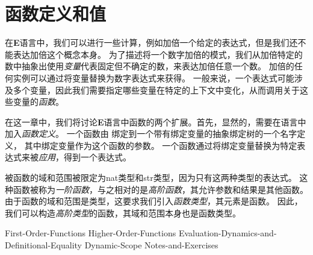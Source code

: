 \chapter{函数定义和值}

在\textbf{E}语言中，我们可以进行一些计算，例如加倍一个给定的表达式，但是我们还不能表达加倍这个概念本身。
为了描述将一个数字加倍的模式，我们从加倍特定的数中抽象出使用\textit{变量}代表固定但不确定的数，来表达加倍任意一个数。
加倍的任何实例可以通过将变量替换为数字表达式来获得。
一般来说，一个表达式可能涉及多个变量，因此我们需要指定哪些变量在特定的上下文中变化，从而调用关于这些变量的\textit{函数}。

在这一章中，我们将讨论\textbf{E}语言中函数的两个扩展。首先，显然的，需要在语言中加入\textit{函数定义}。
一个函数由 绑定到一个带有绑定变量的抽象绑定树的一个名字定义， 其中绑定变量作为这个函数的参数。
一个函数通过将绑定变量替换为特定表达式来被\textit{应用}，得到一个表达式。

被函数的域和范围被限定为nat类型和str类型，因为只有这两种类型的表达式。
这种函数被称为\textit{一阶函数}，与之相对的是\textit{高阶函数}，其允许参数和结果是其他函数。
由于函数的域和范围是类型，这要求我们引入\textit{函数类型}，其元素是函数。
因此，我们可以构造\textit{高阶类型}的函数，其域和范围本身也是函数类型。


{First-Order-Functions}
{Higher-Order-Functions}
{Evaluation-Dynamics-and-Definitional-Equality}
{Dynamic-Scope}
{Notes-and-Exercises}

















